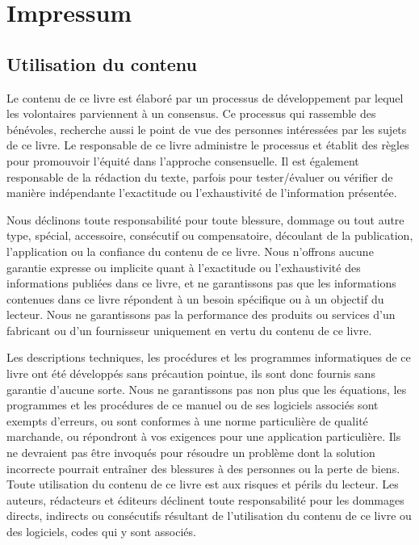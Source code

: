 	\newpage
	\thispagestyle{empty}
	\mbox{}
	\section{Impressum}	
	\subsection{Utilisation du contenu}

	Le contenu de ce livre est \'elabor\'e par un processus de d\'eveloppement par lequel les volontaires parviennent à un consensus. Ce processus qui rassemble des b\'en\'evoles, recherche aussi le point de vue des personnes int\'eress\'ees par les sujets de ce livre. Le responsable de ce livre administre le processus et \'etablit des règles pour promouvoir l'\'equit\'e dans l'approche consensuelle. Il est \'egalement responsable de la r\'edaction du texte, parfois pour tester/\'evaluer ou v\'erifier de manière ind\'ependante l'exactitude ou l'exhaustivit\'e de l'information pr\'esent\'ee.

	Nous d\'eclinons toute responsabilit\'e pour toute blessure, dommage ou tout autre type, sp\'ecial, accessoire, cons\'ecutif ou compensatoire, d\'ecoulant de la publication, l'application ou la confiance du contenu de ce livre. Nous n'offrons aucune garantie expresse ou implicite quant à l'exactitude ou l'exhaustivit\'e des informations publi\'ees dans ce livre, et ne garantissons pas que les informations contenues dans ce livre r\'epondent à un besoin sp\'ecifique ou à un objectif du lecteur. Nous ne garantissons pas la performance des produits ou services d'un fabricant ou d'un fournisseur uniquement en vertu du contenu de ce livre.
	
	Les descriptions techniques, les proc\'edures et les programmes informatiques de ce livre ont \'et\'e d\'evelopp\'es sans pr\'ecaution pointue, ils sont donc fournis sans garantie d'aucune sorte. Nous ne garantissons pas non plus que les \'equations, les programmes et les proc\'edures de ce manuel ou de ses logiciels associ\'es sont exempts d'erreurs, ou sont conformes à une norme particulière de qualit\'e marchande, ou r\'epondront à vos exigences pour une application particulière. Ils ne devraient pas être invoqu\'es pour r\'esoudre un problème dont la solution incorrecte pourrait entraîner des blessures à des personnes ou la perte de biens. Toute utilisation du contenu de ce livre est aux risques et p\'erils du lecteur. Les auteurs, r\'edacteurs et \'editeurs d\'eclinent toute responsabilit\'e pour les dommages directs, indirects ou cons\'ecutifs r\'esultant de l'utilisation du contenu de ce livre ou des logiciels, codes  qui y sont associ\'es.

